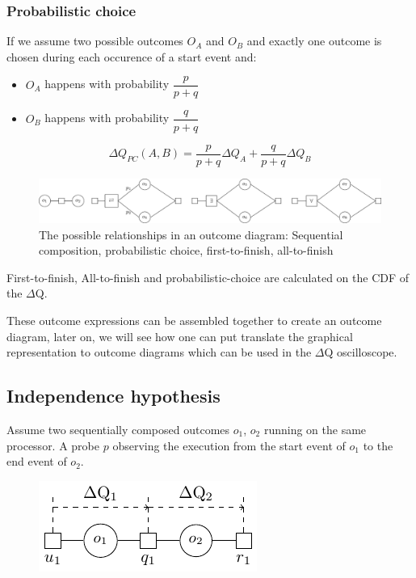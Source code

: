     \subsubsection{Probabilistic choice}
        If we assume two possible outcomes $O_A$ and $O_B$ and exactly one outcome is chosen during each occurence of a start event and:
        \begin{itemize}
            \item $O_A$ happens with probability $\dfrac{p}{p+q}$
            \item $O_B$ happens with probability $\dfrac{q}{p + q}$
        \end{itemize}
        \begin{equation}
           \Delta Q_{PC}(A, B) = \dfrac{p}{p + q}\Delta Q_A + \dfrac{q}{p + q}\Delta Q_B 
            \label{eq:pc}
        \end{equation} 

    \begin{figure}[H]
        \begin{center}
            \includegraphics[width = \textwidth]{tikz/op.pdf}
        \end{center}
        \caption{The possible relationships in an outcome diagram: Sequential composition, probabilistic choice, first-to-finish, all-to-finish}
        \label{fig:op}
    \end{figure}
    First-to-finish, All-to-finish and probabilistic-choice are calculated on the CDF of the $\Delta$Q.
    
    These outcome expressions can be assembled together to create an outcome diagram, later on, we will see how one can put translate the graphical representation to outcome diagrams which can be used in the $\Delta$Q oscilloscope.
    
    \subsection{Independence hypothesis}    
        Assume two sequentially composed outcomes $o_1$, $o_2$ running on the same processor. A probe $p$ observing the execution from the start event of $o_1$ to the end event of $o_2$. 
        \begin{figure}[H]
            \begin{center}
                \includegraphics[scale=1]{tikz/indep.pdf}
            \end{center}
        \end{figure}
        
